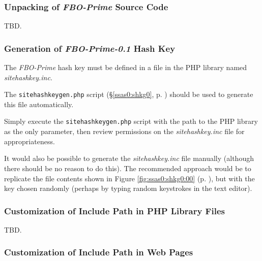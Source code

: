 \documentclass[letterpaper,10pt,titlepage]{article}
\newcommand{\productbasename}{FBO-Prime}
\newcommand{\productversion}{0.1}
\newcommand{\productname}{\productbasename{}-\productversion}
\begin{document}

\subsubsection{Unpacking of \emph{\productbasename{}} Source Code}
\label{sins0:sssi0:susc0}

TBD.


\subsubsection{Generation of \emph{\productname{}} Hash Key}
\label{sins0:sssi0:sgsh0}

The \emph{\productbasename{}} hash key must be defined in a file in the
PHP library named \emph{sitehashkey.inc}.

The \texttt{sitehashkeygen.php}
script (\S{}\ref{ssas0:shkg0}, p. \pageref{ssas0:shkg0}) should
be used to generate this file automatically.

Simply execute the \texttt{sitehashkeygen.php} script with the path to the
PHP library as the only parameter, then review
permissions on the \emph{sitehashkey.inc} file for appropriateness.

It would also be possible to generate the \emph{sitehashkey.inc}
file manually (although there should be no reason to do this).
The recommended approach would be to replicate the file contents
shown in Figure \ref{fig:ssas0:shkg0:00} (p. \pageref{fig:ssas0:shkg0:00}), 
but with the key chosen randomly (perhaps by
typing random keystrokes in the text editor).


\subsubsection{Customization of Include Path in PHP Library Files}
\label{sins0:sssi0:sphl0}

TBD.


\subsubsection{Customization of Include Path in Web Pages}
\label{sins0:sssi0:scwp0}
\end{document}
